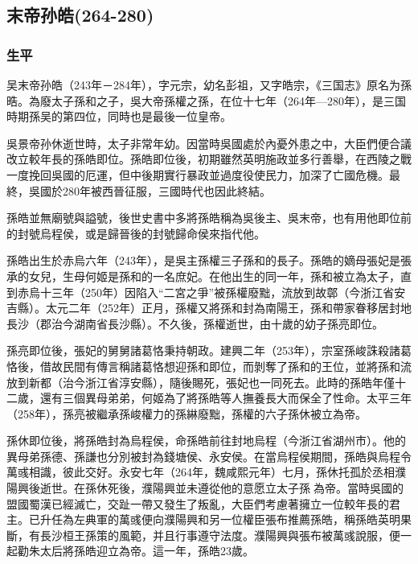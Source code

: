 
\subsection{末帝孙皓\tiny(264-280)}

\subsubsection{生平}

吴末帝孙皓（243年－284年），字元宗，幼名彭祖，又字皓宗，《三国志》原名为孫晧。為廢太子孫和之子，吳大帝孫權之孫，在位十七年（264年—280年），是三国時期孫吴的第四位，同時也是最後一位皇帝。

吳景帝孙休逝世時，太子非常年幼。因當時吳國處於內憂外患之中，大臣們便合議改立較年長的孫皓即位。孫皓即位後，初期雖然英明施政並多行善舉，在西陵之戰一度挽回吳國的厄運，但中後期實行暴政並過度役使民力，加深了亡國危機。最終，吳國於280年被西晉征服，三國時代也因此終結。

孫皓並無廟號與謚號，後世史書中多將孫皓稱為吳後主、吳末帝，也有用他即位前的封號烏程侯，或是歸晉後的封號歸命侯來指代他。

孫皓出生於赤烏六年（243年），是吳主孫權三子孫和的長子。孫皓的嫡母張妃是張承的女兒，生母何姬是孫和的一名庶妃。在他出生的同一年，孫和被立為太子，直到赤烏十三年（250年）因陷入“二宮之爭”被孫權廢黜，流放到故鄣（今浙江省安吉縣）。太元二年（252年）正月，孫權又將孫和封為南陽王，孫和帶家眷移居封地長沙（郡治今湖南省長沙縣）。不久後，孫權逝世，由十歲的幼子孫亮即位。

孫亮即位後，張妃的舅舅諸葛恪秉持朝政。建興二年（253年），宗室孫峻誅殺諸葛恪後，借故民間有傳言稱諸葛恪想迎孫和即位，而剝奪了孫和的王位，並將孫和流放到新都（治今浙江省淳安縣），隨後賜死，張妃也一同死去。此時的孫皓年僅十二歲，還有三個異母弟弟，何姬為了將孫皓等人撫養長大而保全了性命。太平三年（258年），孫亮被繼承孫峻權力的孫綝廢黜，孫權的六子孫休被立為帝。

孫休即位後，將孫皓封為烏程侯，命孫皓前往封地烏程（今浙江省湖州市）。他的異母弟孫德、孫謙也分別被封為錢塘侯、永安侯。在當烏程侯期間，孫皓與烏程令萬彧相識，彼此交好。永安七年（264年，魏咸熙元年）七月，孫休托孤於丞相濮陽興後逝世。在孫休死後，濮陽興並未遵從他的意愿立太子孫𩅦為帝。當時吳國的盟國蜀漢已經滅亡，交趾一帶又發生了叛亂，大臣們考慮著擁立一位較年長的君主。已升任為左典軍的萬彧便向濮陽興和另一位權臣張布推薦孫皓，稱孫皓英明果斷，有長沙桓王孫策的風範，并且行事遵守法度。濮陽興與張布被萬彧說服，便一起勸朱太后將孫皓迎立為帝。這一年，孫皓23歲。

